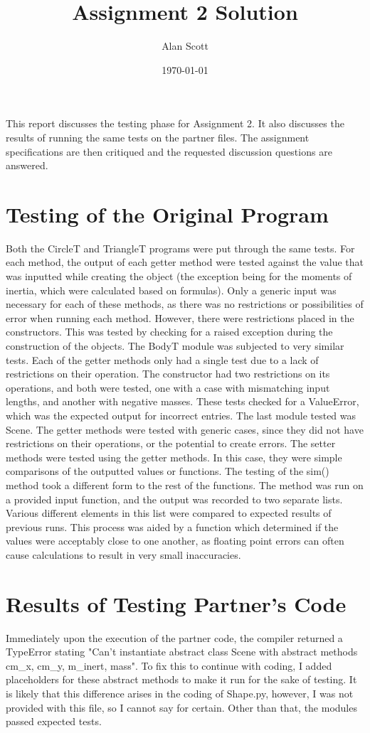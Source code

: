 \documentclass[12pt]{article}
\title{Assignment 2 Solution}
\author{Alan Scott}
\date{\today}
\begin{document}
\maketitle

This report discusses the testing phase for Assignment 2. It also discusses the results
of running the same tests on the partner files. The assignment specifications
are then critiqued and the requested discussion questions are answered.

\section{Testing of the Original Program}
Both the CircleT and TriangleT programs were put through the same tests. For each method, the output of each getter method were tested against the value that was inputted while creating the object (the exception being for the moments of inertia, which were calculated based on formulas). Only a generic input was necessary for each of these methods, as there was no restrictions or possibilities of error when running each method. However, there were restrictions placed in the constructors. This was tested by checking for a raised exception during the construction of the objects. The BodyT module was subjected to very similar tests. Each of the getter methods only had a single test due to a lack of restrictions on their operation. The constructor had two restrictions on its operations, and both were tested, one with a case with mismatching input lengths, and another with negative masses. These tests checked for a ValueError, which was the expected output for incorrect entries. The last module tested was Scene. The getter methods were tested with generic cases, since they did not have restrictions on their operations, or the potential to create errors. The setter methods were tested using the getter methods. In this case, they were simple comparisons of the outputted values or functions. The testing of the sim() method took a different form to the rest of the functions. The method was run on a provided input function, and the output was recorded to two separate lists. Various different elements in this list were compared to expected results of previous runs. This process was aided by a function which determined if the values were acceptably close to one another, as floating point errors can often cause calculations to result in very small inaccuracies. 

\section{Results of Testing Partner's Code}
Immediately upon the execution of the partner code, the compiler returned a TypeError stating "Can't instantiate abstract class Scene with abstract methods cm\_x, cm\_y, m\_inert, mass". To fix this to continue with coding, I added placeholders for these abstract methods to make it run for the sake of testing. It is likely that this difference arises in the coding of Shape.py, however, I was not provided with this file, so I cannot say for certain. Other than that, the modules passed expected tests.
\end{document}
